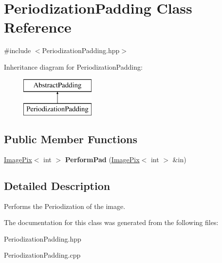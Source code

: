 \hypertarget{class_periodization_padding}{}\section{Periodization\+Padding Class Reference}
\label{class_periodization_padding}


{\ttfamily \#include $<$Periodization\+Padding.\+hpp$>$}

Inheritance diagram for Periodization\+Padding\+:\begin{figure}[H]
\begin{center}
\leavevmode
\includegraphics[height=2.000000cm]{class_periodization_padding}
\end{center}
\end{figure}
\subsection*{Public Member Functions}
\begin{DoxyCompactItemize}
\item 
\mbox{\label{class_periodization_padding_a00b3d9784fa3319fe65dcc05b8353371}} 
\hyperlink{class_image_pix}{Image\+Pix}$<$ int $>$ {\bfseries Perform\+Pad} (\hyperlink{class_image_pix}{Image\+Pix}$<$ int $>$ \&in)
\end{DoxyCompactItemize}


\subsection{Detailed Description}
Performs the Periodization of the image. 

The documentation for this class was generated from the following files\+:\begin{DoxyCompactItemize}
\item 
Periodization\+Padding.\+hpp\item 
Periodization\+Padding.\+cpp\end{DoxyCompactItemize}
